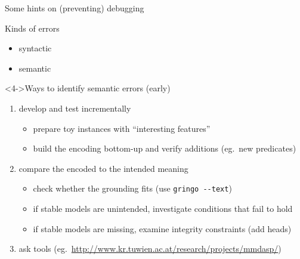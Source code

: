 \begin{frame}{Some hints on (preventing) debugging}
\begin{block}{Kinds of errors}
\vspace*{-2mm}
  \begin{itemize}
  \item \alert<2>{syntactic} \hfill{}
  \item \alert<3->{semantic} \hfill{}
  \end{itemize}
\vspace*{-2mm}
\end{block}
\begin{block}<4->{Ways to identify semantic errors (early)}
  \begin{enumerate}
  \item<4-> \alert{develop and test incrementally}
    \begin{itemize}
    \item prepare toy instances with ``interesting features''
    \item build the encoding bottom-up and verify additions (eg.\ new predicates)
    \end{itemize}
  \item<5-> \alert{compare the encoded to the intended meaning}
    \begin{itemize}
    \item check whether the grounding fits (use \alert{\lstinline{gringo --text}})
    \item if stable models are unintended, investigate conditions that fail to hold
    \item if stable models are missing, examine integrity constraints (add heads)
    \end{itemize}
  \item<6-> ask tools (eg.\ {\footnotesize\url{http://www.kr.tuwien.ac.at/research/projects/mmdasp/}})
  \end{enumerate}
\end{block}
\end{frame}
